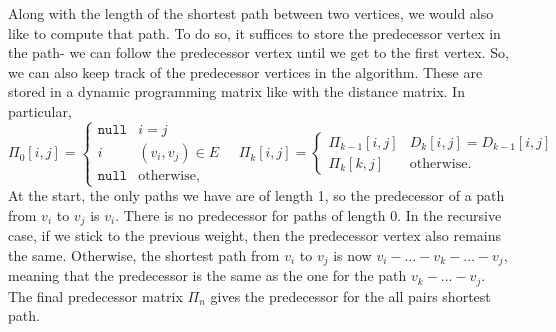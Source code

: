 \documentclass[a4paper, openany]{memoir}
\begin{document}
    Along with the length of the shortest path between two vertices, we would also like to compute that path. To do so, it suffices to store the predecessor vertex in the path- we can follow the predecessor vertex until we get to the first vertex. So, we can also keep track of the predecessor vertices in the algorithm. These are stored in a dynamic programming matrix like with the distance matrix. In particular, 
    \[\Pi_0[i, j] = \begin{cases}
        \texttt{null} & i = j \\
        i & (v_i, v_j) \in E \\
        \texttt{null} & \text{otherwise},
    \end{cases} \quad \Pi_k[i, j] = \begin{cases}
        \Pi_{k-1}[i, j] & D_k[i, j] = D_{k-1}[i, j] \\
        \Pi_k[k, j] & \text{otherwise}.
    \end{cases}\]
    At the start, the only paths we have are of length 1, so the predecessor of a path from $v_i$ to $v_j$ is $v_i$. There is no predecessor for paths of length 0. In the recursive case, if we stick to the previous weight, then the predecessor vertex also remains the same. Otherwise, the shortest path from $v_i$ to $v_j$ is now $v_i - \dots - v_k - \dots - v_j$, meaning that the predecessor is the same as the one for the path $v_k - \dots - v_j$. The final predecessor matrix $\Pi_n$ gives the predecessor for the all pairs shortest path.
\end{document}
